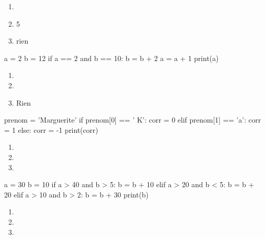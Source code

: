 \documentclass[a4paper,10pt]{article}
\begin{document}
\begin{multicols}{2}
\begin{enumerate}[\case\ \ a.]
\item 	{}
\item 	5
\item 	rien
\end{enumerate}
\begin{pythoncode}
a = 2
b = 12
if a == 2 and b == 10:
    b = b + 2
    a = a + 1
    print(a)
\end{pythoncode}
\begin{enumerate}[\case\ \ a.]
\item 	{}
\item 	{}
\item 	Rien
\end{enumerate}
\begin{pythoncode}
prenom = 'Marguerite'
if prenom[0] == ' K':
    corr = 0
elif prenom[1] == 'a':
    corr = 1
else:
    corr = -1
print(corr)
\end{pythoncode}
\begin{enumerate}[\case\ \ a.]
\item 	{}
\item 	{}
\item 	{}
\end{enumerate}
\begin{pythoncode}
a = 30
b = 10
if a > 40 and b > 5:
    b = b + 10
elif a > 20 and b < 5:
    b = b + 20
elif a > 10 and b > 2:
    b = b + 30
print(b)
\end{pythoncode}
\begin{enumerate}[\case\ \ a.]
\item 	{}
\item 	{}
\item 	{}
\end{enumerate}
\end{multicols}
\end{document}
